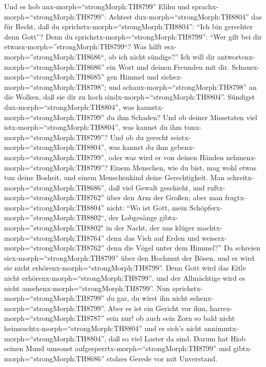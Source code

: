  Und es hob anx-morph=``strongMorph:TH8799'' Elihu und
sprachx-morph=``strongMorph:TH8799'':  Achtest
dux-morph=``strongMorph:TH8804'' das für Recht, daß du
sprichstx-morph=``strongMorph:TH8804'': ``Ich bin gerechter denn Gott''?
 Denn du sprichstx-morph=``strongMorph:TH8799'': ``Wer gilt
bei dir etwasx-morph=''strongMorph:TH8799``? Was hilft
esx-morph=''strongMorph:TH8686``, ob ich nicht sündige?'' 
Ich will dir antwortenx-morph=``strongMorph:TH8686'' ein Wort und deinen
Freunden mit dir.  Schauex-morph=``strongMorph:TH8685'' gen
Himmel und siehex-morph=``strongMorph:TH8798''; und
schaux-morph=``strongMorph:TH8798'' an die Wolken, daß sie dir zu hoch
sindx-morph=``strongMorph:TH8804''.  Sündigst
dux-morph=``strongMorph:TH8804'', was
kannstx-morph=``strongMorph:TH8799'' du ihm Schaden? Und ob deiner
Missetaten viel istx-morph=``strongMorph:TH8804'', was kannst du ihm
tunx-morph=``strongMorph:TH8799''?  Und ob du gerecht
seistx-morph=``strongMorph:TH8804'', was kannst du ihm
gebenx-morph=``strongMorph:TH8799'', oder was wird er von deinen Händen
nehmenx-morph=``strongMorph:TH8799''?  Einem Menschen, wie
du bist, mag wohl etwas tun deine Bosheit, und einem Menschenkind deine
Gerechtigkeit.  Man schreitx-morph=``strongMorph:TH8686'',
daß viel Gewalt geschieht, und ruftx-morph=``strongMorph:TH8762'' über
den Arm der Großen;  aber man
fragtx-morph=``strongMorph:TH8804'' nicht: ``Wo ist Gott, mein
Schöpferx-morph=''strongMorph:TH8802``, der Lobgesänge
gibtx-morph=''strongMorph:TH8802" in der Nacht,  der uns
klüger machtx-morph=``strongMorph:TH8764'' denn das Vieh auf Erden und
weiserx-morph=``strongMorph:TH8762'' denn die Vögel unter dem Himmel?''
 Da schreien siex-morph=``strongMorph:TH8799'' über den
Hochmut der Bösen, und er wird sie nicht
erhörenx-morph=``strongMorph:TH8799''.  Denn Gott wird das
Eitle nicht erhörenx-morph=``strongMorph:TH8799'', und der Allmächtige
wird es nicht ansehenx-morph=``strongMorph:TH8799''.  Nun
sprichstx-morph=``strongMorph:TH8799'' du gar, du wirst ihn nicht
sehenx-morph=``strongMorph:TH8799''. Aber es ist ein Gericht vor ihm,
harrex-morph=``strongMorph:TH8787'' sein nur!  ob auch sein
Zorn so bald nicht heimsuchtx-morph=``strongMorph:TH8804'' und er sich's
nicht annimmtx-morph=``strongMorph:TH8804'', daß so viel Laster da sind.
 Darum hat Hiob seinen Mund umsonst
aufgesperrtx-morph=``strongMorph:TH8799'' und
gibtx-morph=``strongMorph:TH8686'' stolzes Gerede vor mit Unverstand.

